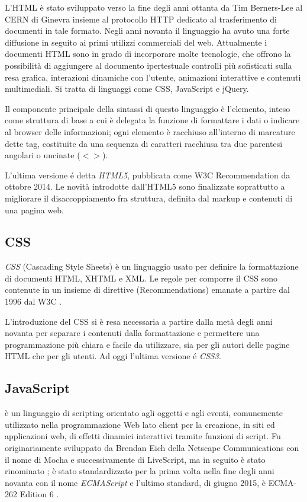 L'HTML è stato sviluppato verso la fine degli anni ottanta da Tim Berners-Lee al CERN di Ginevra insieme al protocollo HTTP dedicato al trasferimento di documenti in tale formato. Negli anni novanta il linguaggio ha avuto una forte diffusione in seguito ai primi utilizzi commerciali del web. Attualmente i documenti HTML sono in grado di incorporare molte tecnologie, che offrono la possibilità di aggiungere al documento ipertestuale controlli più sofisticati sulla resa grafica, interazioni dinamiche con l'utente, animazioni interattive e contenuti multimediali. Si tratta di linguaggi come CSS, JavaScript e jQuery.

Il componente principale della sintassi di questo linguaggio è l'elemento, inteso come struttura di base a cui è delegata la funzione di formattare i dati o indicare al browser delle informazioni; ogni elemento è racchiuso all'interno di marcature dette tag, costituite da una sequenza di caratteri racchiusa tra due parentesi angolari o uncinate ($< >$).

L'ultima versione é detta \emph{HTML5}, pubblicata come W3C Recommendation da ottobre 2014. Le novità introdotte dall'HTML5 sono finalizzate soprattutto a migliorare il disaccoppiamento fra struttura, definita dal markup e contenuti di una pagina web.

\subsection{CSS}
\label{subs:css}
\emph{CSS} (Cascading Style Sheets) è un linguaggio usato per definire la formattazione di documenti HTML, XHTML e XML. Le regole per comporre il CSS sono contenute in un insieme di direttive (Recommendations) emanate a partire dal 1996 dal W3C \cite{css}.

L'introduzione del CSS si è resa necessaria a partire dalla metà degli anni novanta per separare i contenuti dalla formattazione e permettere una programmazione più chiara e facile da utilizzare, sia per gli autori delle pagine HTML che per gli utenti. Ad oggi l'ultima versione é \emph{CSS3}.

\subsection{JavaScript}
\label{subs:js}
\emph{{\js}} è un linguaggio di scripting orientato agli oggetti e agli eventi, comunemente utilizzato nella programmazione Web lato client per la creazione, in siti ed applicazioni web, di effetti dinamici interattivi tramite funzioni di script. Fu originariamente sviluppato da Brendan Eich della Netscape Communications con il nome di Mocha e successivamente di LiveScript, ma in seguito è stato rinominato {\js}; è stato standardizzato per la prima volta nella fine degli anni novanta con il nome \emph{ECMAScript} e l'ultimo standard, di giugno 2015, è ECMA-262 Edition 6 \cite{jsecma}.

